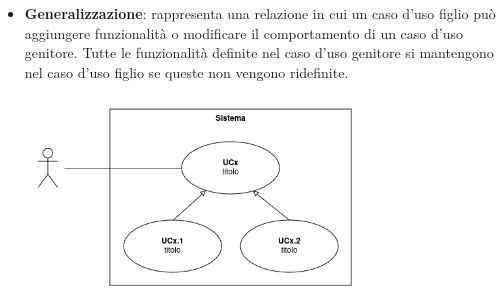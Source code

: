 \begin{itemize}
\begin{itemize}
\begin{center}
		            \end{center}
		      \item \textbf{Generalizzazione}: rappresenta una relazione in cui un caso d'uso figlio può aggiungere funzionalità o modificare il comportamento di un caso d'uso genitore. Tutte le funzionalità definite nel caso d'uso genitore si mantengono nel caso d'uso figlio se queste non vengono ridefinite.
		            \begin{center}
			            \includegraphics*[width=9cm]{../../../images/norme_di_progetto/generalizzazione_uc.png}
		            \end{center}
	      \end{itemize}


\end{itemize}

